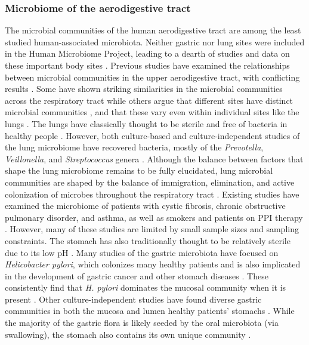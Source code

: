 \documentclass[12pt]{article}
\begin{document}
\subsubsection{Microbiome of the aerodigestive tract}
The microbial communities of the human aerodigestive tract are among the least 
studied human-associated microbiota. 
Neither gastric nor lung sites were included in the 
Human Microbiome Project, leading to a dearth of studies and data on 
these important body sites \cite{bassis-source-2015}. Previous studies have examined the relationships between microbial communities in  the upper 
aerodigestive tract, with conflicting results \cite{bassis-source-2015, almomani-cf_sputum-2016, rosen-ppi-2015, charslon-topographical-2011}. 
Some have shown striking similarities in the microbial
communities across the respiratory tract \cite{bassis-source-2015, almomani-cf_sputum-2016} while others
argue that different sites have distinct microbial communities \cite{rosen-ppi-2015},
and that these vary even within individual sites like the lungs \cite{erbdownward-copd-2011, dickson-spatial-2015}. The lungs have classically thought to be sterile and free of bacteria in 
healthy people \cite{bassis-source-2015, beck-lung-2012, charslon-topographical-2011}. 
However, both culture-based
and culture-independent studies of the lung microbiome have recovered
bacteria, mostly of the \textit{Prevotella}, \textit{Veillonella}, and \textit{Streptococcus} genera \cite{bassis-source-2015}. 
Although the balance between factors that shape the lung microbiome 
remains to be fully elucidated, lung microbial communities are shaped by the balance of
immigration, elimination, and active colonization of microbes 
throughout the respiratory tract \cite{bassis-source-2015, dickson-lung_microbiome-2014}.
Existing studies have examined the microbiome of patients with cystic fibrosis, chronic obstructive 
pulmonary disorder, and asthma, as well as smokers and patients on PPI therapy 
\cite{almomani-cf_sputum-2016, rosen-ppi-2015, erbdownward-copd-2011}.
However, many of these studies are limited by small sample sizes and sampling constraints. The stomach has also traditionally thought to be
relatively sterile due to its low pH \cite{lawson-gastric-2010}.
Many studies of the gastric microbiota have focused on \textit{Helicobacter pylori}, 
which colonizes many healthy patients and is also implicated in the development of gastric cancer and other stomach diseases \cite{bik-stomach-2006}.
These consistently find that \textit{H. pylori} dominates the mucosal 
community when it is present \cite{lawson-gastric-2010, bik-stomach-2006}.
Other culture-independent studies have found diverse gastric communities in 
both the mucosa and lumen healthy patients' stomachs \cite{bassis-source-2015, rosen-ppi-2015, lawson-gastric-2010}.
While the majority of the gastric flora is likely seeded by the
oral microbiota (via swallowing), 
the stomach also contains its own unique community \cite{bassis-source-2015, lawson-gastric-2010}.
\end{document}
